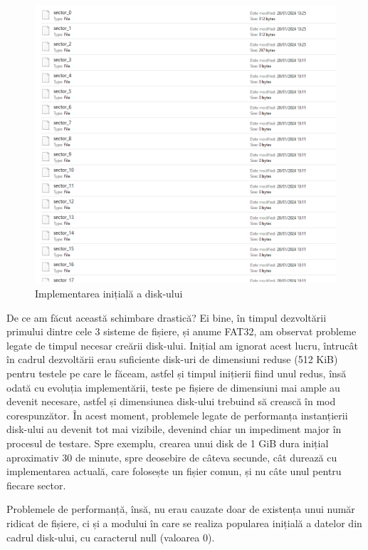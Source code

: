 \bigskip

\begin{figure}[h]
    \centering
    \includegraphics[width=1.0\linewidth]{images/2.3.png}
    \caption{Implementarea inițială a disk-ului}
    \label{fig:enter-label}
\end{figure}

\bigskip

De ce am făcut această schimbare drastică? Ei bine, în timpul dezvoltării primului dintre cele 3 sisteme de fișiere, și anume FAT32, am observat probleme legate de timpul necesar creării disk-ului. Inițial am ignorat acest lucru, întrucât în cadrul dezvoltării erau suficiente disk-uri de dimensiuni reduse (512 KiB) pentru testele pe care le făceam, astfel și timpul inițierii fiind unul redus, însă odată cu evoluția implementării, teste pe fișiere de dimensiuni mai ample au devenit necesare, astfel și dimensiunea disk-ului trebuind să crească în mod corespunzător. În acest moment, problemele legate de performanța instanțierii disk-ului au devenit tot mai vizibile, devenind chiar un impediment major în procesul de testare. Spre exemplu, crearea unui disk de 1 GiB dura inițial aproximativ 30 de minute, spre deosebire de câteva secunde, cât durează cu implementarea actuală, care folosește un fișier comun, și nu câte unul pentru fiecare sector.

Problemele de performanță, însă, nu erau cauzate doar de existența unui număr ridicat de fișiere, ci și a modului în care se realiza popularea inițială a datelor din cadrul disk-ului, cu caracterul null (valoarea 0).

